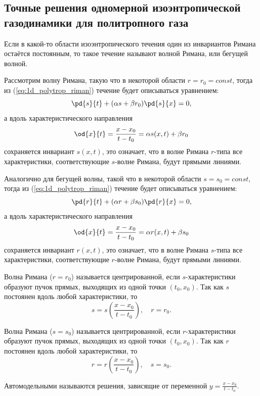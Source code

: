\documentclass[a4paper, 14pt]{extarticle}
\begin{document}
\subsection{Точные решения одномерной изоэнтропической газодинамики для политропного газа}

\begin{dfn}
	Если в какой-то области изоэнтропического течения один из инвариантов Римана остаётся постоянным, то такое течение называют \alert{волной Римана}, или \alert{бегущей волной}. 
\end{dfn}

Рассмотрим волну Римана, такую что в некоторой области $r = r_0 = const$, тогда из (\ref{eq:1d_polytrop_riman}) течение будет описываться уравнением:
\[
\pd{s}{t}+(\alpha s + \beta r_0)\pd{s}{x} = 0,
\]	
а вдоль характеристического направления 
\[
\od{x}{t} = \frac{x-x_0}{t-t_0} = \alpha s(x,t) + \beta r_0
\]
сохраняется инвариант $s(x,t)$, это означает, что в волне Римана $r$-типа все характеристики, соответствующие $s$-волне Римана, будут \alert{прямыми линиями}.
	

Аналогично для бегущей волны, такой что в некоторой области $s = s_0 = const$, тогда из (\ref{eq:1d_polytrop_riman}) течение будет описываться уравнением:
\[
\pd{r}{t}+(\alpha r + \beta s_0)\pd{r}{x} = 0,
\]	
а вдоль характеристического направления 
\[
\od{x}{t} = \frac{x-x_0}{t-t_0} = \alpha r(x,t) + \beta s_0
\]
сохраняется инвариант $r(x,t)$, это означает, что в волне Римана $s$-типа все характеристики, соответствующие $r$-волне Римана, будут \alert{прямыми линиями}.

\begin{dfn}
Волна Римана ($r=r_0$) называется \alert{центрированной}, если $s$-характеристики образуют пучок прямых, выходящих из одной точки $(t_0,x_0)$.
Так как $s$ постоянен вдоль любой характеристики, то 		
\[
	s = s\left(\frac{x-x_0}{t-t_0} \right),\quad r=r_0.
\]			
\end{dfn}
	
\begin{dfn}
Волна Римана ($s=s_0$) называется \alert{центрированной}, если $r$-характеристики образуют пучок прямых, выходящих из одной точки $(t_0,x_0)$.
Так как $r$ постоянен вдоль любой характеристики, то 
\[
	r = r\left(\frac{x-x_0}{t-t_0} \right),\quad s=s_0.
\]			
\end{dfn}
	

\begin{dfn}
\alert{Автомодельными} называются решения, зависящие от переменной $y=\displaystyle\frac{x-x_0}{t-t_0}$.
\end{dfn}
\end{document}

